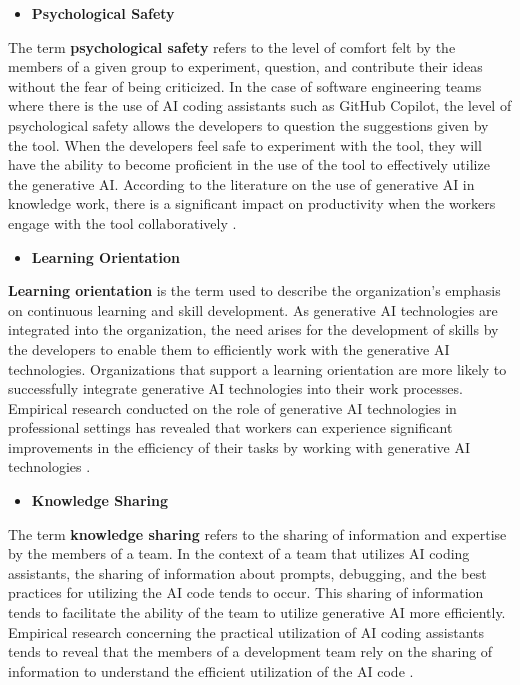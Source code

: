 \begin{itemize}
	\item \textbf{Psychological Safety} 
\end{itemize}
The term \textbf{psychological safety} refers to the level of comfort felt by the members of a given group to experiment, question, and contribute their ideas without the fear of being criticized. In the case of software engineering teams where there is the use of AI coding assistants such as GitHub Copilot, the level of psychological safety allows the developers to question the suggestions given by the tool. When the developers feel safe to experiment with the tool, they will have the ability to become proficient in the use of the tool to effectively utilize the generative AI. According to the literature on the use of generative AI in knowledge work, there is a significant impact on productivity when the workers engage with the tool collaboratively \autocite{Noy2023}.

\begin{itemize}
	\item \textbf{Learning Orientation} 
\end{itemize}
\textbf{Learning orientation} is the term used to describe the organization's emphasis on continuous learning and skill development. As generative AI technologies are integrated into the organization, the need arises for the development of skills by the developers to enable them to efficiently work with the generative AI technologies. Organizations that support a learning orientation are more likely to successfully integrate generative AI technologies into their work processes. Empirical research conducted on the role of generative AI technologies in professional settings has revealed that workers can experience significant improvements in the efficiency of their tasks by working with generative AI technologies \autocite{Brynjolfsson2025}. 

\begin{itemize}
	\item \textbf{Knowledge Sharing} 
\end{itemize}
The term \textbf{knowledge sharing} refers to the sharing of information and expertise by the members of a team. In the context of a team that utilizes AI coding assistants, the sharing of information about prompts, debugging, and the best practices for utilizing the AI code tends to occur. This sharing of information tends to facilitate the ability of the team to utilize generative AI more efficiently. Empirical research concerning the practical utilization of AI coding assistants tends to reveal that the members of a development team rely on the sharing of information to understand the efficient utilization of the AI code \autocite{Sergeyuk2025}.

